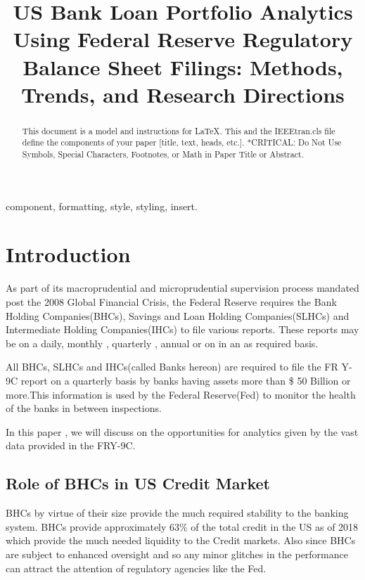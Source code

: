 \documentclass[conference]{IEEEtran}
\begin{document}
\title{US Bank Loan Portfolio Analytics Using Federal Reserve Regulatory Balance Sheet Filings: Methods, Trends, and Research Directions
}

\author{

}

\maketitle

\begin{abstract}
This document is a model and instructions for \LaTeX.
This and the IEEEtran.cls file define the components of your paper [title, text, heads, etc.]. *CRITICAL: Do Not Use Symbols, Special Characters, Footnotes, 
or Math in Paper Title or Abstract.
\end{abstract}

\begin{IEEEkeywords}
component, formatting, style, styling, insert.
\end{IEEEkeywords}

\section{Introduction}
As part of its macroprudential and microprudential supervision process mandated post the 2008 Global Financial Crisis, the Federal Reserve requires the Bank Holding Companies(BHCs), Savings and Loan Holding Companies(SLHCs) and Intermediate Holding Companies(IHCs) to file various reports. These reports may be on a daily, monthly , quarterly , annual or on in an as required basis. 

All BHCs, SLHCs and IHCs(called Banks hereon) are required to file the FR Y-9C report on a quarterly basis by banks having assets more than \$ 50 Billion or more.This information is used by the Federal Reserve(Fed) to monitor the health of the banks in between inspections.\cite{Fed9C}

In this paper , we will discuss on the opportunities for analytics given by the vast data provided in the FRY-9C.
\subsection{Role of BHCs in US Credit Market}
     BHCs by virtue of their size provide the much required stability to the banking system. BHCs provide approximately 63\% of the total credit in the US as of 2018 which provide the much needed liquidity to the Credit markets. Also since BHCs are subject to enhanced oversight and so any minor glitches in the performance can attract the attention of regulatory agencies like the Fed.
     
\end{document}
